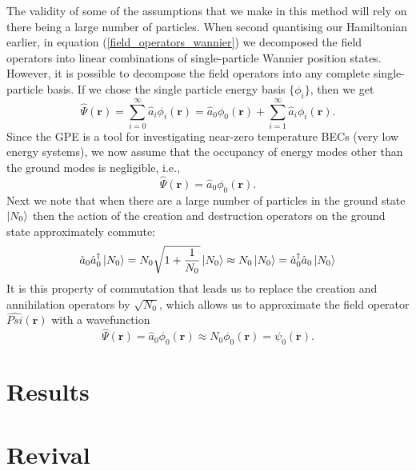 \documentclass[a4paper,10pt]{article}
\theoremstyle{plain}
\begin{document}
The validity of some of the assumptions that we make in this 
method will rely on there being a large number of particles. When second 
quantising our Hamiltonian earlier, in equation (\ref{field_operators_wannier}) 
we decomposed the field operators into linear combinations of single-particle 
Wannier position states. However, it is possible to decompose the field 
operators into any complete single-particle basis. If we chose the single 
particle energy basis $\{\phi_i\}$, then we get
\begin{equation}
 \hat{\Psi}(\mathbf{r})
 =
 \sum_{i=0}^\infty \hat{a}_i\phi_{i}(\mathbf{r}) 
 = 
 \hat{a}_0\phi_{0}(\mathbf{r}) 
 + 
 \sum_{i=1}^\infty \hat{a}_i\phi_{i}(\mathbf{r}).
\end{equation}
Since the GPE is a tool for investigating near-zero temperature BECs (very low 
energy systems), we now assume that the occupancy of energy modes other than 
the ground modes is negligible, i.e.,
\begin{equation}
 \hat{\Psi}(\mathbf{r})=\hat{a}_0\phi_{0}(\mathbf{r}).
\end{equation}
Next we note that when there are a large number of particles in the ground
state $\ket{N_0}$ then the action of the creation and destruction operators
on the ground state approximately commute:
\begin{equation}
 \hat{a}_0\hat{a}^\dagger_0\ket{N_0}
 =
 N_0 \sqrt{1+\frac{1}{N_0}}\ket{N_0}
 \approx
 N_0\ket{N_0}
 =
 \hat{a}^\dagger_0\hat{a}_0\ket{N_0}
\end{equation}
It is this property of commutation that leads us to replace the creation and
annihilation operators by $\sqrt{N_0}$, which allows us to approximate the
field operator $\hat{Psi}(\mathbf{r})$ with a wavefunction
\begin{equation}
 \hat{\Psi}(\mathbf{r})
 =
 \hat{a}_0\phi_{0}(\mathbf{r})
 \approx
 N_0\phi_{0}(\mathbf{r})
 =\psi_0(\mathbf{r}).
\end{equation}



\section{Results}

\section{Revival \label{revival}}
\end{document}
